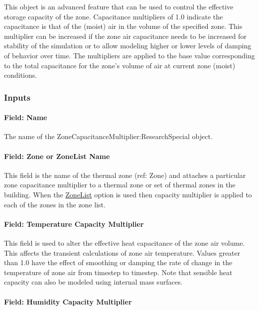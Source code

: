 This object is an advanced feature that can be used to control the effective storage capacity of the zone. Capacitance multipliers of 1.0 indicate the capacitance is that of the (moist) air in the volume of the specified zone. This multiplier can be increased if the zone air capacitance needs to be increased for stability of the simulation or to allow modeling higher or lower levels of damping of behavior over time. The multipliers are applied to the base value corresponding to the total capacitance for the zone's volume of air at current zone (moist) conditions.

\subsubsection{Inputs}\label{inputs-14-014}

\paragraph{Field: Name}\label{field-name-hybrid-model}

The name of the ZoneCapacitanceMultiplier:ResearchSpecial object.

\paragraph{Field: Zone or ZoneList Name}\label{field-Zone-or-zonelist-name-hybrid-model}

This field is the name of the thermal zone (ref: Zone) and attaches a particular zone capacitance multiplier to a thermal zone or set of thermal zones in the building. When the \hyperref[zonelist]{ZoneList} option is used then capacity multiplier is applied to each of the zones in the zone list.

\paragraph{Field: Temperature Capacity Multiplier}\label{field-temperature-capacity-multiplier}

This field is used to alter the effective heat capacitance of the zone air volume. This affects the transient calculations of zone air temperature. Values greater than 1.0 have the effect of smoothing or damping the rate of change in the temperature of zone air from timestep to timestep. Note that sensible heat capacity can also be modeled using internal mass surfaces.

\paragraph{Field: Humidity Capacity Multiplier}\label{field-humidity-capacity-multiplier}

